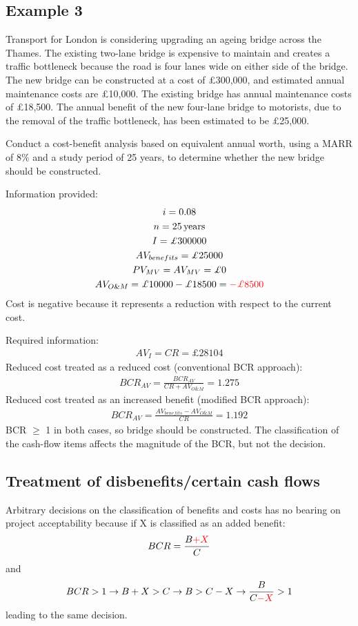 \subsection{Example 3}
Transport for London is considering upgrading an ageing bridge across the Thames. The existing two-lane bridge is expensive to maintain and creates a traffic bottleneck because the road is four lanes wide on either side of the bridge. The new bridge can be constructed at a cost of \pounds 300,000, and estimated annual maintenance costs are \pounds 10,000. The existing bridge has annual maintenance costs of \pounds 18,500. The annual benefit of the new four-lane bridge to motorists, due to the removal of the traffic bottleneck, has been estimated to be \pounds 25,000.

Conduct a cost-benefit analysis based on equivalent annual worth, using a MARR of 8\% and a study period of 25 years, to determine whether the new bridge should be constructed.

Information provided:
\begin{gather}
  i = 0.08\\
  n = 25\, \textrm{years}\\
  I = \pounds 300000\\
  AV_{benefits} = \pounds 25000\\
  PV_{MV} = AV_{MV} = \pounds 0\\
  AV_{O\&M} = \pounds 10000 - \pounds 18500 = \textcolor{red}{-\pounds 8500}
\end{gather}
Cost is negative because it represents a reduction with respect to the current cost.

Required information:
\begin{gather}
  AV_I = CR = \pounds 28104
\end{gather}
Reduced cost treated as a reduced cost (conventional BCR approach):
\begin{gather}
  BCR_{AV} = \frac{BCR_{AV}}{CR + AV_{O\&M}} = 1.275
\end{gather}
Reduced cost treated as an increased benefit (modified BCR approach):
\begin{gather}
  BCR_{AV} = \frac{AV_{benefits} - AV_{O\&M}}{CR} = 1.192
\end{gather}
BCR $\geq$ 1 in both cases, so bridge should be constructed. The classification of the cash-flow items affects the magnitude of the BCR, but not the decision.
\subsection{Treatment of disbenefits/certain cash flows}
Arbitrary decisions on the classification of benefits and costs has no bearing on project acceptability because if X is classified as an added benefit:
\begin{gather}
  BCR = \frac{B \textcolor{red}{+ X }}{C}
\end{gather}
and
\begin{gather}
  BCR > 1 \rightarrow B + X > C \rightarrow B > C - X \rightarrow \frac{B}{C \textcolor{red}{- X}} > 1
\end{gather}
leading to the same decision.